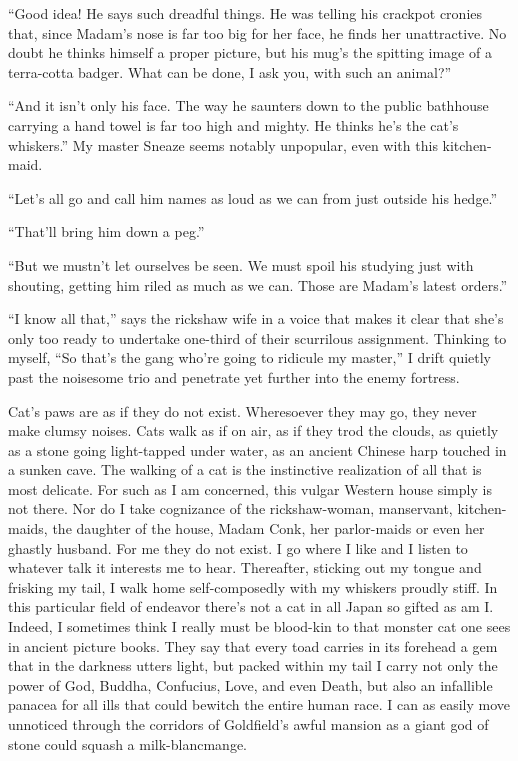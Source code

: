 \documentclass{book}
\begin{document}
``Good idea! He says such dreadful things. He was telling his crackpot
cronies that, since Madam's nose is far too big for her face, he finds
her unattractive. No doubt he thinks himself a proper picture, but his
mug's the spitting image of a terra-cotta badger. What can be done, I
ask you, with such an animal?''

``And it isn't only his face. The way he saunters down to the public
bathhouse carrying a hand towel is far too high and mighty. He thinks
he's the cat's whiskers.'' My master Sneaze seems notably unpopular,
even with this kitchen-maid.

``Let's all go and call him names as loud as we can from just outside
his hedge.''

``That'll bring him down a peg.''

``But we mustn't let ourselves be seen. We must spoil his studying just
with shouting, getting him riled as much as we can. Those are Madam's
latest orders.''

``I know all that,'' says the rickshaw wife in a voice that makes it
clear that she's only too ready to undertake one-third of their
scurrilous assignment. Thinking to myself, ``So that's the gang who're
going to ridicule my master,'' I drift quietly past the noisesome trio
and penetrate yet further into the enemy fortress.

Cat's paws are as if they do not exist. Wheresoever they may go, they
never make clumsy noises. Cats walk as if on air, as if they trod the
clouds, as quietly as a stone going light-tapped under water, as an
ancient Chinese harp touched in a sunken cave. The walking of a cat is
the instinctive realization of all that is most delicate. For such as I
am concerned, this vulgar Western house simply is not there. Nor do I
take cognizance of the rickshaw-woman, manservant, kitchen-maids, the
daughter of the house, Madam Conk, her parlor-maids or even her ghastly
husband. For me they do not exist. I go where I like and I listen to
whatever talk it interests me to hear. Thereafter, sticking out my
tongue and frisking my tail, I walk home self-composedly with my
whiskers proudly stiff. In this particular field of endeavor there's not
a cat in all Japan so gifted as am I. Indeed, I sometimes think I really
must be blood-kin to that monster cat one sees in ancient picture books.
They say that every toad carries in its forehead a gem that in the
darkness utters light, but packed within my tail I carry not only the
power of God, Buddha, Confucius, Love, and even Death, but also an
infallible panacea for all ills that could bewitch the entire human
race. I can as easily move unnoticed through the corridors of
Goldfield's awful mansion as a giant god of stone could squash a
milk-blancmange.
\end{document}
